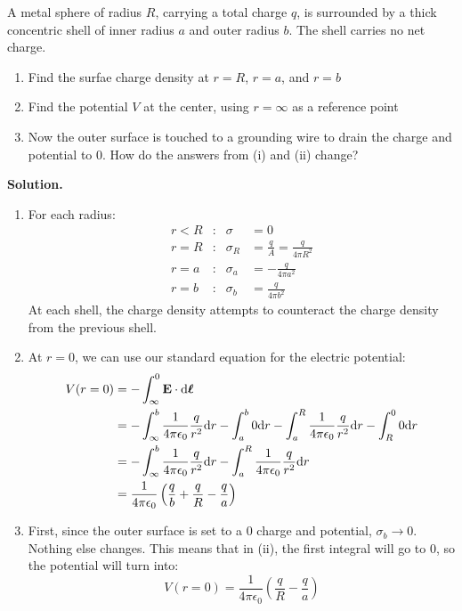 \documentclass[a4paper]{article}
\begin{document}
\begin{eg}
	A metal sphere of radius $R$, carrying a total charge $q$, is
	surrounded by a thick concentric shell of inner radius $a$ and
	outer radius $b$. The shell carries no net charge.
	\begin{enumerate}
		\item Find the surfae charge density at $r=R$, $r=a$, and $r=b$
		\item Find the potential $V$ at the center, using
			$r=\infty$ as a reference point
		\item Now the outer surface is touched to a grounding wire
			to drain the charge and potential to $0$. How do
			the answers from (i) and (ii) change?
	\end{enumerate}
	\textbf{Solution.}
	\begin{enumerate}
		\item For each radius:
		\begin{align*}
			r<R&:& \sigma &= 0\\
			r=R&:& \sigma_R &= \frac{q}{A}
			   = \frac{q}{4\pi R^2}\\
			r=a&:& \sigma_a &= -\frac{q}{4\pi a^2}\\
			r=b&:& \sigma_b &= \frac{q}{4\pi b^2}
		\end{align*}
		At each shell, the charge density attempts to counteract the
		charge density from the previous shell.
		\item At $r=0$, we can use our standard equation for the
			electric potential:
		\begin{align*}
			V(r=0) &= -\int_\infty^0 \boldsymbol{\mathbf{E}}\cdot\mathrm{d}\boldsymbol{\mathbf{\ell}}\\
			       &= -\int_\infty^b\frac{1}{4\pi\epsilon_0}
					\frac{q}{r^2}\mathrm{d} r
				-\int_a^b 0\mathrm{d} r
				-\int_a^R  \frac{1}{4\pi\epsilon_0}
					\frac{q}{r^2}\mathrm{d} r
				-\int_R^0 0\mathrm{d} r\\
			       &= -\int_\infty^b\frac{1}{4\pi\epsilon_0}
					\frac{q}{r^2}\mathrm{d} r
				-\int_a^R  \frac{1}{4\pi\epsilon_0}
					\frac{q}{r^2}\mathrm{d} r\\
			       &= \frac{1}{4\pi\epsilon_0}\left(
					\frac{q}{b} + \frac{q}{R} - \frac{q}{a}
				\right)
		\end{align*}
		\item First, since the outer surface is set to a 0 charge and
			potential, $\sigma_b \to 0$. Nothing else changes.
			This means that in (ii), the first integral will go to
			0, so the potential will turn into:
			\[
				V(r=0) =
				\frac{1}{4\pi\epsilon_0}
				\left(\frac{q}{R}-\frac{q}{a}\right)
			\]
	\end{enumerate}
\end{eg}
\end{document}
